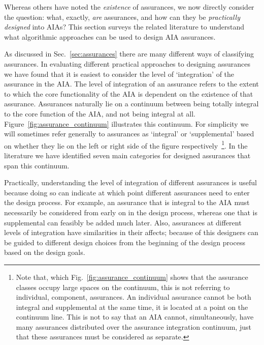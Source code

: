     Whereas others have noted the \textit{existence} of assurances, we now directly consider the question: what, exactly, \textit{are} assurances, and how can they be \textit{practically designed} into AIAs? 
    This section surveys the related literature to understand what algorithmic approaches can be used to design AIA assurances. 
    
    As discussed in Sec.~\ref{sec:assurances} there are many different ways of classifying assurances. In evaluating different practical approaches to designing assurances we have found that it is easiest to consider the level of `integration' of the assurance in the AIA. The level of integration of an assurance refers to the extent to which the core functionality of the AIA is dependent on the existence of that assurance. Assurances naturally lie on a continuum between being totally integral to the core function of the AIA, and not being integral at all. Figure~\ref{fig:assurance_continuum} illustrates this continuum. For simplicity we will sometimes refer generally to assurances as `integral' or `supplemental' based on whether they lie on the left or right side of the figure respectively~\footnote{Note that, which Fig.~\ref{fig:assurance_continuum} shows that the assurance classes occupy large spaces on the continuum, this is not referring to individual, component, assurances. An individual assurance cannot be both integral and supplemental at the same time, it is located at a point on the continuum line. This is not to say that an AIA cannot, simultaneously, have many assurances distributed over the assurance integration continuum, just that these assurances must be considered as separate.}. In the literature we have identified seven main categories for designed assurances that span this continuum.
    
    Practically, understanding the level of integration of different assurances is useful because doing so can indicate at which point different assurances need to enter the design process. For example, an assurance that is integral to the AIA must necessarily be considered from early on in the design process, whereas one that is supplemental can feasibly be added much later. Also, assurances at different levels of integration have similarities in their affects; because of this designers can be guided to different design choices from the beginning of the design process based on the design goals.

